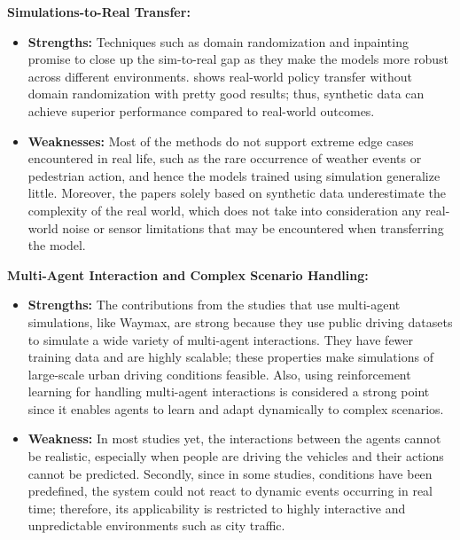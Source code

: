 \documentclass[lettersize,journal]{IEEEtran}
\begin{document}
\vspace{1em}

\textbf{Simulations-to-Real Transfer:}
\begin{itemize}
    \item \textbf{Strengths:} Techniques such as domain randomization and inpainting \cite{ref5} promise to close up the sim-to-real gap as they make the models more robust across different environments. \cite{ref5} shows real-world policy transfer without domain randomization with pretty good results; thus, synthetic data can achieve superior performance compared to real-world outcomes.
    \item \textbf{Weaknesses:} Most of the methods do not support extreme edge cases encountered in real life, such as the rare occurrence of weather events or pedestrian action, and hence the models trained using simulation generalize little. Moreover, the papers solely based on synthetic data \cite{ref5} underestimate the complexity of the real world, which does not take into consideration any real-world noise or sensor limitations that may be encountered when transferring the model.
\end{itemize}

\vspace{1em}

\textbf{Multi-Agent Interaction and Complex Scenario Handling:}
\begin{itemize}
    \item \textbf{Strengths:} The contributions from the studies that use multi-agent simulations, like Waymax, \cite{ref4} are strong because they use public driving datasets to simulate a wide variety of multi-agent interactions. They have fewer training data and are highly scalable; these properties make simulations of large-scale urban driving conditions feasible. Also, using reinforcement learning for handling multi-agent interactions is considered a strong point since it enables agents to learn and adapt dynamically to complex scenarios.
    \item \textbf{Weakness:} In most studies yet, the interactions between the agents cannot be realistic, especially when people are driving the vehicles and their actions cannot be predicted. Secondly, since in some studies, conditions have been predefined, the system could not react to dynamic events occurring in real time; therefore, its applicability is restricted to highly interactive and unpredictable environments such as city traffic.
\end{itemize}
\end{document}
